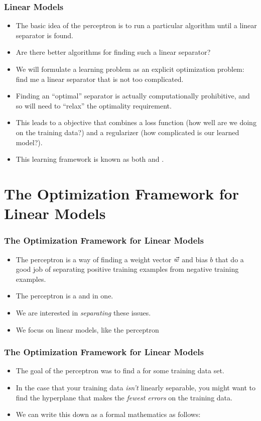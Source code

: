 \documentclass[trans,aspectratio=169]{beamer}
\begin{document}
\begin{frame}
  \frametitle{Linear Models}
\begin{itemize}
\item 
The basic idea of the perceptron is to run a particular algorithm
until a linear separator is found.  
\item Are there better
algorithms for finding such a linear separator?  
\item We will formulate a learning problem as an explicit optimization
problem: find me a linear separator that is not too complicated. 
\item Finding an ``optimal'' separator is actually
computationally prohibitive, and so will need to ``relax'' the
optimality requirement. 
\item  This leads to a 
objective that combines a loss function (how well are we doing on the
training data?) and a regularizer (how complicated is our learned
model?).  
\item This learning framework is known as both  and .
\end{itemize}
\end{frame}


\section{The Optimization Framework for Linear Models}
\begin{frame}
  \frametitle{The Optimization Framework for Linear Models}
\begin{itemize}
\item 
The perceptron is a way of finding a weight
vector ${\vec w}$ and bias $b$ that do a good job of separating positive
training examples from negative training examples. 
\item The perceptron is
a  and  in one. 
\item We are
interested in \emph{separating} these issues. 
\item  We focus on linear
models, like the perceptron
\end{itemize}
\end{frame}


\begin{frame}
  \frametitle{The Optimization Framework for Linear Models}
\begin{itemize}
\item 
The goal of the perceptron was to find a  for some training data set.  
\item  In the case that your training data
\emph{isn't} linearly separable, you might want to find the hyperplane
that makes the \emph{fewest errors} on the training data.  
\item We can
write this down as a formal mathematics 
as follows:
%
%
\end{itemize}
\end{frame}
\end{document}
